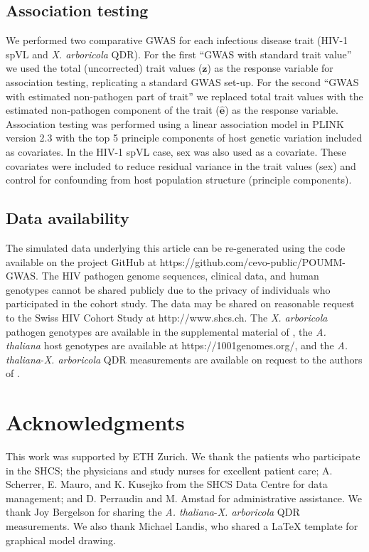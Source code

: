\documentclass[11pt]{article}
\begin{document}
\begin{linenumbers}
\subsection*{Association testing}
We performed two comparative GWAS for each infectious disease trait (HIV-1 spVL and \emph{X. arboricola} QDR). For the first ``GWAS with standard trait value'' we used the total (uncorrected) trait values ($\bm{z}$) as the response variable for association testing, replicating a standard GWAS set-up. For the second ``GWAS with estimated non-pathogen part of trait'' we replaced total trait values with the estimated non-pathogen component of the trait ($\hat{\bm{e}}$) as the response variable. Association testing was performed using a linear association model in PLINK version 2.3 \citep{Chang2015} with the top 5 principle components of host genetic variation included as covariates. In the HIV-1 spVL case, sex was also used as a covariate. These covariates were included to reduce residual variance in the trait values (sex) and control for confounding from host population structure (principle components).

\subsection*{Data availability}
The simulated data underlying this article can be re-generated using the code available on the project GitHub at https://github.com/cevo-public/POUMM-GWAS. The HIV pathogen genome sequences, clinical data, and human genotypes cannot be shared publicly due to the privacy of individuals who participated in the cohort study. The data may be shared on reasonable request to the Swiss HIV Cohort Study at http://www.shcs.ch. The \emph{X. arboricola} pathogen genotypes are available in the supplemental material of \citep{Wang2018Two-wayGenomes}, the \emph{A. thaliana} host genotypes are available at https://1001genomes.org/, and the \emph{A. thaliana}-\emph{X. arboricola} QDR measurements are available on request to the authors of \citep{Wang2018Two-wayGenomes}.

\section*{Acknowledgments}

This work was supported by ETH Zurich. We thank the patients who participate in the SHCS; the physicians and study nurses for excellent patient care; A. Scherrer,  E. Mauro, and K. Kusejko from the SHCS Data Centre for data management; and D. Perraudin and M. Amstad for administrative assistance. We thank Joy Bergelson for sharing the \emph{A. thaliana}-\emph{X. arboricola} QDR measurements. We also thank Michael Landis, who shared a LaTeX template for graphical model drawing.
 

\end{linenumbers}
\end{document}
